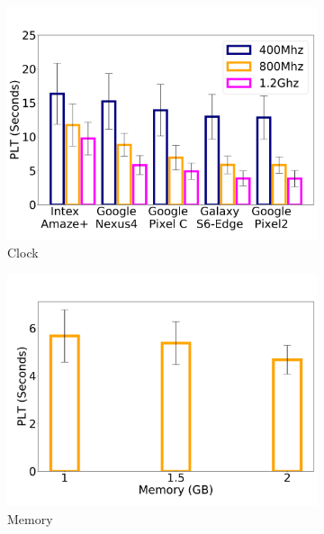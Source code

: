 \begin{figure}
    \begin{subfigure}[b]{0.33\textwidth}
        \centering
        \includegraphics[width=1\linewidth]{sections/device-work/clock-device}
        \caption{Clock}
    \end{subfigure}
    \begin{subfigure}[b]{0.33\textwidth}
        \centering
        \includegraphics[width=1\linewidth]{sections/device-work/plt-memory}
        \caption{Memory}
    \end{subfigure}%
    \begin{subfigure}[b]{0.33\textwidth}
        \centering

\end{subfigure}
\end{figure}
